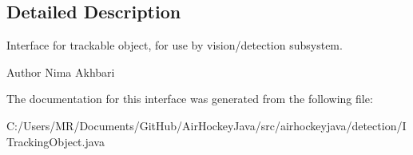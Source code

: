 \subsection{Detailed Description}
Interface for trackable object, for use by vision/detection subsystem.

\begin{DoxyAuthor}{Author}
Nima Akhbari 
\end{DoxyAuthor}


The documentation for this interface was generated from the following file\+:\begin{DoxyCompactItemize}
\item 
C\+:/\+Users/\+M\+R/\+Documents/\+Git\+Hub/\+Air\+Hockey\+Java/src/airhockeyjava/detection/I\+Tracking\+Object.\+java\end{DoxyCompactItemize}
